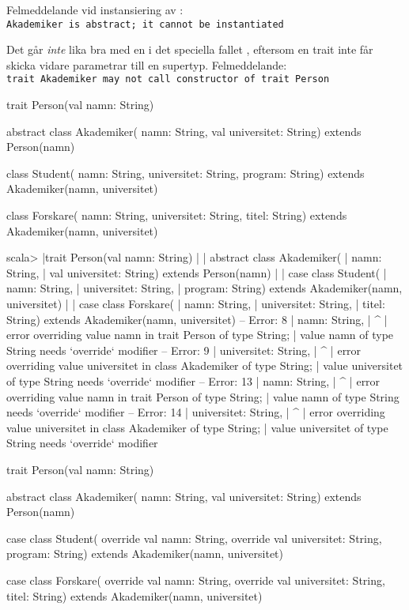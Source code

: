\SubtaskSolved  
Felmeddelande vid instansiering av :\\
\texttt{Akademiker is abstract; it cannot be instantiated}

Det går \emph{inte} lika bra med en  i det speciella fallet , eftersom en trait inte får skicka vidare parametrar till en supertyp. Felmeddelande:\\
\texttt{trait Akademiker may not call constructor of trait Person}
\begin{Code}
trait Person(val namn: String)

abstract class Akademiker(
  namn: String,
  val universitet: String) extends Person(namn)

class Student(
  namn: String,
  universitet: String,
  program: String) extends Akademiker(namn, universitet)

class Forskare(
  namn: String,
  universitet: String,
  titel: String) extends Akademiker(namn, universitet)
\end{Code}



\SubtaskSolved  
\begin{REPLnonum}
scala>  
     |trait Person(val namn: String)                                                                              
     | 
     | abstract class Akademiker(
     |   namn: String,
     |   val universitet: String) extends Person(namn)
     | 
     | case class Student(
     |   namn: String,
     |   universitet: String,
     |   program: String) extends Akademiker(namn, universitet)
     | 
     | case class Forskare(
     |   namn: String,
     |   universitet: String,
     |   titel: String) extends Akademiker(namn, universitet)
-- Error:     
8 |  namn: String,
  |  ^
  |  error overriding value namn in trait Person of type String;
  |    value namn of type String needs `override` modifier
-- Error:
9 |  universitet: String,
  |  ^
  |  error overriding value universitet in class Akademiker of type String;
  |    value universitet of type String needs `override` modifier
-- Error:
13 |  namn: String,
   |  ^
   |  error overriding value namn in trait Person of type String;
   |    value namn of type String needs `override` modifier
-- Error:
14 |  universitet: String,
   |  ^
   |  error overriding value universitet in class Akademiker of type String;
   |    value universitet of type String needs `override` modifier
\end{REPLnonum}

\begin{Code}
trait Person(val namn: String)

abstract class Akademiker(
  namn: String,
  val universitet: String) extends Person(namn)

case class Student(
  override val namn: String,
  override val universitet: String,
  program: String) extends Akademiker(namn, universitet)

case class Forskare(
  override val namn: String,
  override val universitet: String,
  titel: String) extends Akademiker(namn, universitet)
\end{Code}


